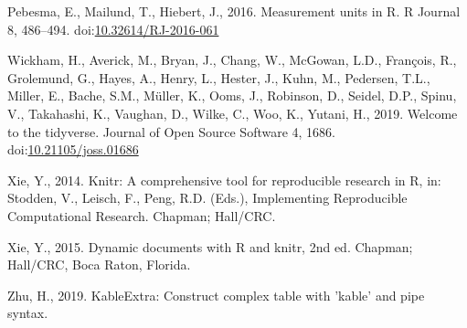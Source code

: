 \documentclass[]{elsarticle} %
\begin{document}
\leavevmode\hypertarget{ref-Pebesma2016}{}%
Pebesma, E., Mailund, T., Hiebert, J., 2016. Measurement units in R. R
Journal 8, 486--494.
doi:\href{https://doi.org/10.32614/RJ-2016-061}{10.32614/RJ-2016-061}

\leavevmode\hypertarget{ref-Wickham2019}{}%
Wickham, H., Averick, M., Bryan, J., Chang, W., McGowan, L.D., François,
R., Grolemund, G., Hayes, A., Henry, L., Hester, J., Kuhn, M., Pedersen,
T.L., Miller, E., Bache, S.M., Müller, K., Ooms, J., Robinson, D.,
Seidel, D.P., Spinu, V., Takahashi, K., Vaughan, D., Wilke, C., Woo, K.,
Yutani, H., 2019. Welcome to the tidyverse. Journal of Open Source
Software 4, 1686.
doi:\href{https://doi.org/10.21105/joss.01686}{10.21105/joss.01686}

\leavevmode\hypertarget{ref-Xie2014}{}%
Xie, Y., 2014. Knitr: A comprehensive tool for reproducible research in
R, in: Stodden, V., Leisch, F., Peng, R.D. (Eds.), Implementing
Reproducible Computational Research. Chapman; Hall/CRC.

\leavevmode\hypertarget{ref-Xie2015}{}%
Xie, Y., 2015. Dynamic documents with R and knitr, 2nd ed. Chapman;
Hall/CRC, Boca Raton, Florida.

\leavevmode\hypertarget{ref-Zhu2019}{}%
Zhu, H., 2019. KableExtra: Construct complex table with 'kable' and pipe
syntax.
\end{document}
